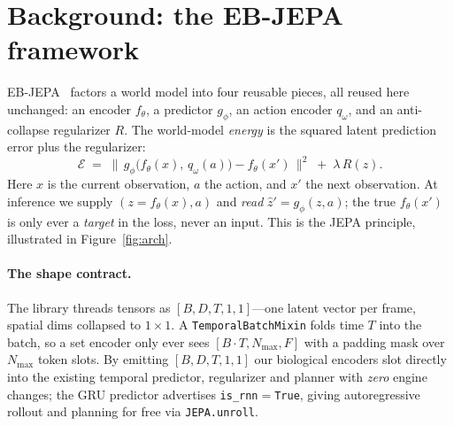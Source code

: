 \documentclass[10pt,twocolumn]{article}
\begin{document}
\section{Background: the EB-JEPA framework}
\label{sec:background}

EB-JEPA~\cite{ebjepa} factors a world model into four reusable pieces, all reused here unchanged: an
encoder $f_\theta$, a predictor $g_\phi$, an action encoder $q_\omega$, and an anti-collapse regularizer
$R$. The world-model \emph{energy} is the squared latent prediction error plus the regularizer:
\begin{equation}
\mathcal{E} \;=\; \big\lVert\, g_\phi\!\big(f_\theta(x),\, q_\omega(a)\big) - f_\theta(x') \,\big\rVert^2
\;+\; \lambda\, R(z).
\label{eq:energy}
\end{equation}
Here $x$ is the current observation, $a$ the action, and $x'$ the next observation. At inference we
supply $(z\!=\!f_\theta(x),a)$ and \emph{read} $\hat z' = g_\phi(z,a)$; the true $f_\theta(x')$ is only
ever a \emph{target} in the loss, never an input. This is the JEPA principle, illustrated in
Figure~\ref{fig:arch}.

\paragraph{The shape contract.}
The library threads tensors as $[B,D,T,1,1]$---one latent vector per frame, spatial dims collapsed to
$1\!\times\!1$. A \texttt{TemporalBatchMixin} folds time $T$ into the batch, so a set encoder only ever
sees $[B\!\cdot\!T, N_{\max}, F]$ with a padding mask over $N_{\max}$ token slots. By emitting
$[B,D,T,1,1]$ our biological encoders slot directly into the existing temporal predictor, regularizer
and planner with \emph{zero} engine changes; the GRU predictor advertises
\texttt{is\_rnn}$=$\texttt{True}, giving autoregressive rollout and planning for free via
\texttt{JEPA.unroll}.
\end{document}
